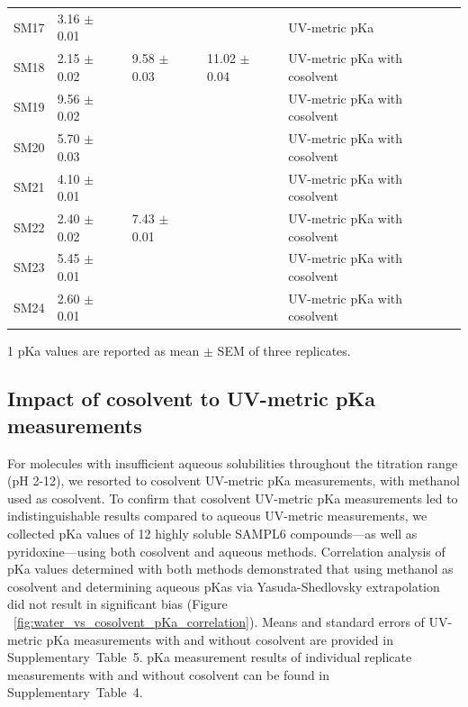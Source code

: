 \documentclass[9pt,lineno]{elife}
\begin{document}
\begin{table}[tb!]
\begin{center}
\begin{threeparttable}
\begin{tabular}{@{}lllll@{}}
SM17 & 3.16 $\pm$ 0.01 &  &  & UV-metric pKa \\
SM18 & 2.15 $\pm$ 0.02 & 9.58 $\pm$ 0.03 & 11.02 $\pm$ 0.04 & UV-metric pKa with cosolvent \\
SM19 & 9.56 $\pm$ 0.02 &  &  & UV-metric pKa with cosolvent \\
SM20 & 5.70 $\pm$ 0.03 &  &  & UV-metric pKa with cosolvent \\
SM21 & 4.10 $\pm$ 0.01 &  &  & UV-metric pKa with cosolvent \\
SM22 & 2.40 $\pm$ 0.02 & 7.43 $\pm$ 0.01 &  & UV-metric pKa with cosolvent \\
SM23 & 5.45 $\pm$ 0.01 &  &  & UV-metric pKa with cosolvent \\
SM24 & 2.60 $\pm$ 0.01 &  &  & UV-metric pKa with cosolvent \\ \bottomrule
\end{tabular}
\begin{tablenotes}
\item[1] pKa values are reported as mean $\pm$ SEM of three replicates.
\end{tablenotes}
\end{threeparttable}
\end{center}
\end{table}

\subsection{Impact of cosolvent to UV-metric pKa measurements}
For molecules with insufficient aqueous solubilities throughout the titration range (pH 2-12), we resorted to cosolvent UV-metric pKa measurements, with methanol used as cosolvent. 
To confirm that cosolvent UV-metric pKa measurements led to indistinguishable results compared to aqueous UV-metric measurements, we collected pKa values of 12 highly soluble SAMPL6 compounds---as well as pyridoxine---using both cosolvent and aqueous methods. 
Correlation analysis of pKa values determined with both methods demonstrated that using methanol as cosolvent and determining aqueous pKas via Yasuda-Shedlovsky extrapolation did not result in significant bias (Figure ~\ref{fig:water_vs_cosolvent_pKa_correlation}). 
Means and standard errors of UV-metric pKa measurements with and without cosolvent are provided in Supplementary~Table~5. 
pKa measurement results of individual replicate measurements with and without cosolvent can be found in Supplementary~Table~4.
\end{document}
